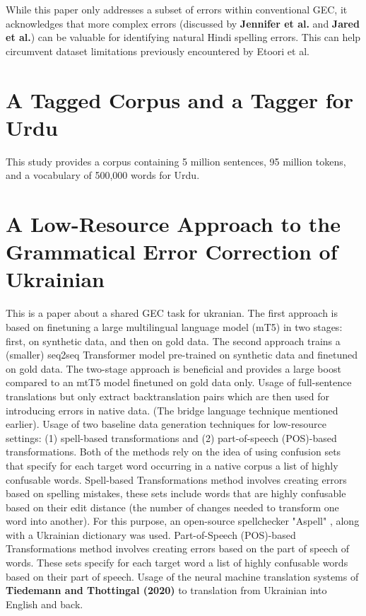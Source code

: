\documentclass{article}
\begin{document}
While this paper only addresses a subset of errors within conventional GEC, it acknowledges that more complex errors (discussed by \textbf{Jennifer et al.} and \textbf{Jared et al.}) can be valuable for identifying natural Hindi spelling errors. This can help circumvent dataset limitations previously encountered by Etoori et al.

\section{A Tagged Corpus and a Tagger for Urdu}

This study provides a corpus containing 5 million sentences, 95 million tokens, and a vocabulary of 500,000 words for Urdu.

\section{A Low-Resource Approach to the Grammatical Error Correction of Ukrainian}

This is a paper about a shared GEC task for ukranian. The first approach is based on finetuning a large multilingual language model (mT5) in two stages: first, on synthetic data, and then on gold data. 
The second approach trains a (smaller) seq2seq Transformer model pre-trained on synthetic data and finetuned on gold data. 
The two-stage approach is beneficial and provides a large boost compared to an mtT5 model finetuned on gold data only.
Usage of full-sentence translations but only extract backtranslation pairs which are then used for introducing errors in native data. (The bridge language technique mentioned earlier).
Usage of two baseline data generation techniques for low-resource settings: (1) spell-based transformations and (2) part-of-speech (POS)-based transformations.
Both of the methods rely on the idea of using confusion sets that specify for each target word occurring in a native corpus a list of highly confusable words.
Spell-based Transformations method involves creating errors based on spelling mistakes, these sets include words that are highly confusable based on their edit distance (the number of changes needed to transform one word into another). For this purpose, an open-source spellchecker "Aspell" , along with a Ukrainian dictionary was used.
Part-of-Speech (POS)-based Transformations method involves creating errors based on the part of speech of words. These sets specify for each target word a list of highly confusable words based on their part of speech.
Usage of the neural machine translation systems of \textbf{Tiedemann and Thottingal (2020)} to translation from Ukrainian into English and back.
\end{document}
